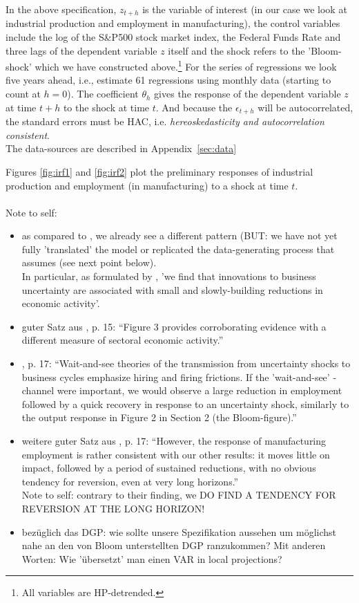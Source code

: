 \documentclass[a4paper,11pt,listof=nochaptergap,oneside,pointednumbers,bibtotoc,bigheadings,liststotoc]{scrbook}
\begin{document}
In the above specification, $z_{t+h}$ is the variable of interest (in our case we look at industrial production and employment in manufacturing), the control variables include the log of the S\&P500 stock market index, the Federal Funds Rate and three lags of the dependent variable $z$ itself and the shock refers to the 'Bloom-shock' which we have constructed above.\footnote{All variables are HP-detrended.} For the series of regressions we look five years ahead, i.e., estimate 61 regressions using monthly data (starting to count at $h=0$). The coefficient $\theta_h$ gives the response of the dependent variable $z$ at time $t+h$ to the shock at time $t$. And because the $\epsilon_{t+h}$ will be autocorrelated, the standard errors must be HAC, i.e. \textit{hereoskedasticity and autocorrelation consistent}.\\
The data-sources are described in Appendix~\ref{sec:data}

Figures \ref{fig:irf1} and \ref{fig:irf2} plot the preliminary responses of industrial production and employment (in manufacturing) to a shock at time $t$. \\
\\
\begingroup
    \fontsize{8pt}{12pt}\selectfont
    Note to self:
\begin{itemize}
	\item as compared to \citet{bloom:09}, we already see a different pattern (BUT: we have not yet fully 'translated' the model or replicated the data-generating process that \citet{bloom:09} assumes (see next point below).\\
	In particular, as formulated by \citet{bachmannetal:13}, 'we find that innovations to business uncertainty are associated with small and slowly-building reductions in economic activity'. 
	\item guter Satz aus \citet{bachmannetal:13}, p. 15: ``Figure 3 provides corroborating evidence with a different measure of sectoral economic activity.'' 
	\item \citet{bachmannetal:13}, p. 17: ``Wait-and-see theories of the transmission from uncertainty shocks to business cycles emphasize hiring and firing frictions. If the 'wait-and-see' - channel were important, we would observe a large reduction in employment followed by a quick recovery in response to an uncertainty shock, similarly to the output response in Figure 2 in Section 2 (the Bloom-figure).''
	\item weitere guter Satz aus \citet{bachmannetal:13}, p. 17: ``However, the response of manufacturing employment is rather consistent with our other results: it moves little on impact, followed by a period of sustained reductions, with no obvious tendency for reversion, even at very long horizons.'' \\
	Note to self: contrary to their finding, we DO FIND A TENDENCY FOR REVERSION AT THE LONG HORIZON!
	\item bezüglich das DGP: wie sollte unsere Spezifikation aussehen um möglichst nahe an den von Bloom unterstellten DGP ranzukommen? Mit anderen Worten: Wie 'übersetzt' man einen VAR in local projections?
\end{itemize}
\endgroup
\end{document}
